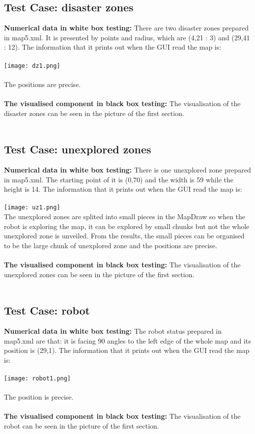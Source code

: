 \documentclass[11pt, a4paper]{article}
\begin{document}
\subsection{Test Case: disaster zones}
\textbf{Numerical data in white box testing:} 
There are two disaster zones prepared in map5.xml. It is presented by points and radius, which are (4,21 : 3) and (29,41 : 12). The information that it prints out when the GUI read the map is:\\
\\
\texttt{[image: dz1.png]}\\
\\
The positions are precise. \\
\\
\textbf{The visualised component in black box testing:}
The visualisation of the disaster zones can be seen in the picture of the first section.\\
\\

\subsection{Test Case: unexplored zones}
\textbf{Numerical data in white box testing:} 
There is one unexplored zone prepared in map5.xml. The starting point of it is (0,70) and the width is 59 while the height is 14. The information that it prints out when the GUI read the map is:\\
\\
\texttt{[image: uz1.png]}
\\
The unexplored zones are splited into small pieces in the MapDraw so when the robot is exploring the map, it can be explored by small chunks but not the whole unexplored zone is unveiled. From the results, the small pieces can be organised to be the large chunk of unexplored zone and the positions are precise. \\
\\
\textbf{The visualised component in black box testing:}
The visualisation of the unexplored zones can be seen in the picture of the first section.\\
\\

\subsection{Test Case: robot}
\textbf{Numerical data in white box testing:} 
The robot status prepared in map5.xml are that: it is facing 90 angles to the left edge of the whole map and its position is (29,1). The information that it prints out when the GUI read the map is:\\
\\
\texttt{[image: robot1.png]}\\
\\
The position is precise. \\
\\
\textbf{The visualised component in black box testing:}
The visualisation of the robot can be seen in the picture of the first section.\\
\\
\end{document}
